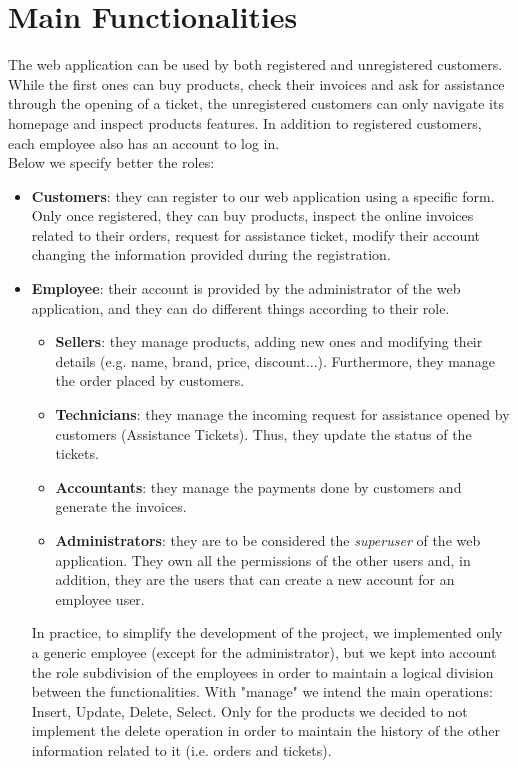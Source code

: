 \section{Main Functionalities}

The web application can be used by both registered and unregistered customers. While the first ones can buy products, check their invoices and ask for assistance through the opening of a ticket, the unregistered customers can only navigate its homepage and inspect products features. In addition to registered customers, each employee also has an account to log in.
\\
Below we specify better the roles:
\begin{itemize}
    \item \textbf{Customers}: they can register to our web application using a specific form. Only once registered, they can buy products, inspect the online invoices related to their orders, request for assistance ticket, modify their account changing the information provided during the registration.
    \item \textbf{Employee}: their account is provided by the administrator of the web application, and they can do different things according to their role.
    \begin{itemize}
        \item \textbf{Sellers}: they manage products, adding new ones and modifying  their details (e.g. name, brand, price, discount...). Furthermore, they manage the order placed by customers.
        \item \textbf{Technicians}: they manage the incoming request for assistance opened by customers (Assistance Tickets). Thus, they update the status of the tickets.
        \item \textbf{Accountants}: they manage the payments done by customers and generate the invoices.
        \item \textbf{Administrators}: they are to be considered the \textit{superuser} of the web application. They own all the permissions of the other users and, in addition, they are the users that can create a new account for an employee user.
    \end{itemize}
    In practice, to simplify the development of the project, we implemented only a generic employee (except for the administrator), but we kept into account the role subdivision of the employees in order to maintain a logical division between the functionalities.
    With "manage" we intend the main operations: Insert, Update, Delete, Select. Only for the products  we decided to not implement the delete operation in order to maintain the history of the other information related to it (i.e. orders and tickets).
\end{itemize}